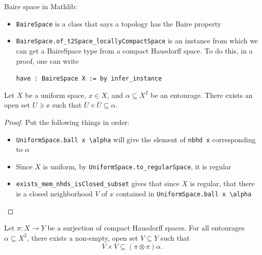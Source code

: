\begin{leanrmk}
    Baire space in Mathlib:
    \begin{itemize}
        \item \verb|BaireSpace| is a class that says a topology has the Baire property

        \item \verb|BaireSpace.of_t2Space_locallyCompactSpace| is an instance from which we can get a BaireSpace type from a compact Hausdorff space.  To do this, in a proof, one can write
        \begin{center}\verb|have : BaireSpace X := by infer_instance|\end{center}
    \end{itemize}
\end{leanrmk}

\begin{lemma}
    \label{lemma_entourage_regularity_at_a_point}
    \label{lemma_closed_nbhd_prod_in_diag}
    \leanok{}
    Let $X$ be a uniform space, $x \in X$, and $\alpha \subseteq X^2$ be an entourage.  There exists an open set $U \ni x$ such that $\overline{U} \times \overline{U} \subseteq \alpha$.
\end{lemma}

\begin{proof}
\leanok{}
    Put the following things in order:
    \begin{itemize}
        \item \verb|UniformSpace.ball x \alpha| will give the element of \verb|nbhd x| corresponding to $\alpha$
        
        \item Since $X$ is uniform, by \verb|UniformSpace.to_regularSpace|, it is regular
        
        \item \verb|exists_mem_nhds_isClosed_subset| gives that since $X$ is regular, that there is a closed neighborhood $V$ of $x$ contained in \verb|UniformSpace.ball x \alpha|
    \end{itemize}
\end{proof}


\begin{lemma}
    \label{lemma_image_of_entourage_somewhere_dense_along_diagonal}
    \leanok{}
    Let $\pi: X \to Y$ be a surjection of compact Hausdorff spaces. For all entourages $\alpha \subseteq X^2$, there exists a non-empty, open set $V \subseteq Y$ such that
    \[V \times V \subseteq (\pi \otimes \pi) \alpha.\]
\end{lemma}

